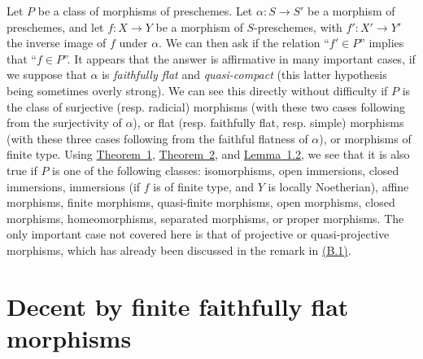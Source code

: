 \documentclass{article}
\newcommand{\oldpage}[1]{\marginpar{\footnotesize$\Big\vert$ \textit{p.~#1}}}
\begin{document}
Let $P$ be a class of morphisms of preschemes.
Let $\alpha\colon S\to S'$ be a morphism of preschemes, and let $f\colon X\to Y$ be a morphism of $S$-preschemes, with $f'\colon X'\to Y'$ the inverse image of $f$ under $\alpha$.
We can then ask if the relation ``$f'\in P$'' implies that ``$f\in P$''.
It appears that the answer is affirmative in many important cases, if we suppose that $\alpha$ is \emph{faithfully flat} and \emph{quasi-compact} (this latter hypothesis being sometimes overly strong).
We can see this directly without difficulty if $P$ is the class of surjective (resp. radicial) morphisms (with these two cases following from the surjectivity of $\alpha$), or flat (resp. faithfully flat, resp. simple) morphisms (with these three cases following from the faithful flatness of $\alpha$), or morphisms of finite type.
Using \hyperref[theorem:B.1(1)]{Theorem~1}, \hyperref[theorem:B.1(2)]{Theorem~2}, and \hyperref[lemma:B.1.2]{Lemma~1.2}, we see that it is also true if $P$ is one of the following classes:
isomorphisms, open immersions, closed immersions, immersions (if $f$ is of finite type, and $Y$ is locally Noetherian), affine morphisms, finite morphisms, quasi-finite morphisms, open morphisms, closed morphisms, homeomorphisms, separated morphisms,
\oldpage{190-21}
or proper morphisms.
The only important case not covered here is that of projective or quasi-projective morphisms, which has already been discussed in the remark in \hyperref[B.1]{(B.1)}.


\section{Decent by finite faithfully flat morphisms}
\label{B.3}
\end{document}
